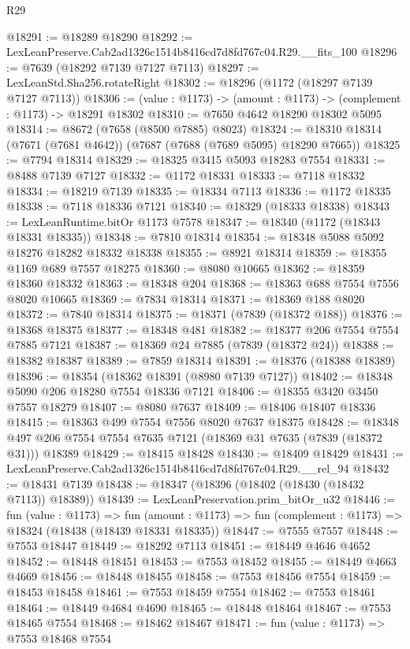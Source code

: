 \begin{lexlean}{R29}
\begin{coremodule}
@18291 := @18289 @18290
@18292 := LexLeanPreserve.Cab2ad1326c1514b8416cd7d8fd767c04.R29.__fits_100
@18296 := @7639 (@18292 @7139 @7127 @7113)
@18297 := LexLeanStd.Sha256.rotateRight
@18302 := @18296 (@1172 (@18297 @7139 @7127 @7113))
@18306 := (value : @1173) -> (amount : @1173) -> (complement : @1173) -> @18291 @18302
@18310 := @7650 @4642 @18290 @18302 @5095
@18314 := @8672 (@7658 (@8500 @7885) @8023)
@18324 := @18310 @18314 (@7671 (@7681 @4642)) (@7687 (@7688 (@7689 @5095) @18290 @7665))
@18325 := @7794 @18314
@18329 := @18325 @3415 @5093 @18283 @7554
@18331 := @8488 @7139 @7127
@18332 := @1172 @18331
@18333 := @7118 @18332
@18334 := @18219 @7139
@18335 := @18334 @7113
@18336 := @1172 @18335
@18338 := @7118 @18336 @7121
@18340 := @18329 (@18333 @18338)
@18343 := LexLeanRuntime.bitOr @1173 @7578
@18347 := @18340 (@1172 (@18343 @18331 @18335))
@18348 := @7810 @18314
@18354 := @18348 @5088 @5092 @18276 @18282 @18332 @18338
@18355 := @8921 @18314
@18359 := @18355 @1169 @689 @7557 @18275
@18360 := @8080 @10665
@18362 := @18359 @18360 @18332
@18363 := @18348 @204
@18368 := @18363 @688 @7554 @7556 @8020 @10665
@18369 := @7834 @18314
@18371 := @18369 @188 @8020
@18372 := @7840 @18314
@18375 := @18371 (@7839 (@18372 @188))
@18376 := @18368 @18375
@18377 := @18348 @481
@18382 := @18377 @206 @7554 @7554 @7885 @7121
@18387 := @18369 @24 @7885 (@7839 (@18372 @24))
@18388 := @18382 @18387
@18389 := @7859 @18314
@18391 := @18376 (@18388 @18389)
@18396 := @18354 (@18362 @18391 (@8980 @7139 @7127))
@18402 := @18348 @5090 @206 @18280 @7554 @18336 @7121
@18406 := @18355 @3420 @3450 @7557 @18279
@18407 := @8080 @7637
@18409 := @18406 @18407 @18336
@18415 := @18363 @499 @7554 @7556 @8020 @7637 @18375
@18428 := @18348 @497 @206 @7554 @7554 @7635 @7121 (@18369 @31 @7635 (@7839 (@18372 @31))) @18389
@18429 := @18415 @18428
@18430 := @18409 @18429
@18431 := LexLeanPreserve.Cab2ad1326c1514b8416cd7d8fd767c04.R29.__rel_94
@18432 := @18431 @7139
@18438 := @18347 (@18396 (@18402 (@18430 (@18432 @7113)) @18389))
@18439 := LexLeanPreservation.prim_bitOr_u32
@18446 := fun (value : @1173) =>
  fun (amount : @1173) => fun (complement : @1173) => @18324 (@18438 (@18439 @18331 @18335))
@18447 := @7555 @7557
@18448 := @7553 @18447
@18449 := @18292 @7113
@18451 := @18449 @4646 @4652
@18452 := @18448 @18451
@18453 := @7553 @18452
@18455 := @18449 @4663 @4669
@18456 := @18448 @18455
@18458 := @7553 @18456 @7554
@18459 := @18453 @18458
@18461 := @7553 @18459 @7554
@18462 := @7553 @18461
@18464 := @18449 @4684 @4690
@18465 := @18448 @18464
@18467 := @7553 @18465 @7554
@18468 := @18462 @18467
@18471 := fun (value : @1173) => @7553 @18468 @7554

\end{coremodule}
\end{lexlean}
